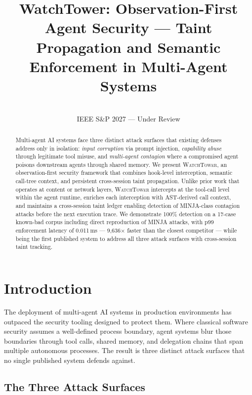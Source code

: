 \documentclass[conference]{IEEEtran}
\title{WatchTower: Observation-First Agent Security --- Taint Propagation
and Semantic Enforcement in Multi-Agent Systems}
\author{\IEEEauthorblockN{Anonymous Submission}\\IEEE S\&P 2027 --- Under Review}
\begin{document}
\maketitle

\begin{abstract}
Multi-agent AI systems face three distinct attack surfaces that existing
defenses address only in isolation: \textit{input corruption} via prompt
injection, \textit{capability abuse} through legitimate tool misuse, and
\textit{multi-agent contagion} where a compromised agent poisons downstream
agents through shared memory. We present \textsc{WatchTower}, an
observation-first security framework that combines hook-level interception,
semantic call-tree context, and persistent cross-session taint propagation.
Unlike prior work that operates at content or network layers,
\textsc{WatchTower} intercepts at the tool-call level within the agent
runtime, enriches each interception with AST-derived call context, and
maintains a cross-session taint ledger enabling detection of MINJA-class
contagion attacks before the next execution trace. We demonstrate 100\%
detection on a 17-case known-bad corpus including direct reproduction of
MINJA attacks, with p99 enforcement latency of 0.011\,ms ---
9{,}636$\times$ faster than the closest competitor --- while being the
first published system to address all three attack surfaces with
cross-session taint tracking.
\end{abstract}

\section{Introduction}
\label{sec:intro}

The deployment of multi-agent AI systems in production environments has
outpaced the security tooling designed to protect them. Where classical
software security assumes a well-defined process boundary, agent systems
blur those boundaries through tool calls, shared memory, and delegation
chains that span multiple autonomous processes. The result is three
distinct attack surfaces that no single published system defends against.

\subsection{The Three Attack Surfaces}
\end{document}
